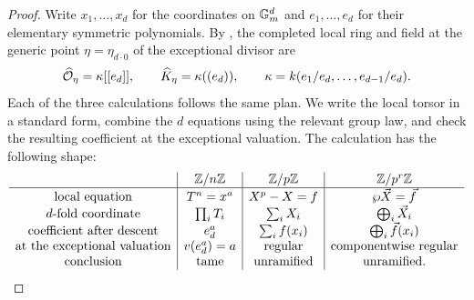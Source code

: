 \begin{proof}
Write $x_1,\dots,x_d$ for the coordinates on $\mathbb{G}_m^d$ and
$e_1,\dots,e_d$ for their elementary symmetric polynomials. By
, the completed local ring and field at
the generic point $\eta=\eta_{d\cdot0}$ of the exceptional divisor are
\begin{equation}\label{eq:complete_field_at_generic_point}
    \widehat{\mathcal{O}}_\eta=\kappa[[e_d]],\qquad
    \widehat K_\eta=\kappa((e_d)),\qquad
    \kappa=k(e_1/e_d,\dots,e_{d-1}/e_d).
\end{equation}
Each of the three calculations follows the same plan. We write the local
torsor in a standard form, combine the $d$ equations using the relevant group
law, and check the resulting coefficient at the exceptional valuation. The
calculation has the following shape:
\[
\begin{array}{c|c|c|c}
 &\mathbb{Z}/n\mathbb{Z}&\mathbb{Z}/p\mathbb{Z}&\mathbb{Z}/p^r\mathbb{Z}\\ \hline
\text{local equation}&T^n=x^a&X^p-X=f&\wp\vec X=\vec f\\
\text{$d$-fold coordinate}&\prod_iT_i&\sum_iX_i&\bigoplus_i\vec X_i\\
\text{coefficient after descent}&e_d^a&\sum_i f(x_i)&\bigoplus_i\vec f(x_i)\\
\text{at the exceptional valuation}&v(e_d^a)=a&\text{regular}&
    \text{componentwise regular}\\
\text{conclusion}&\text{tame}&\text{unramified}&\text{unramified}.
\end{array}
\]


\end{proof}
